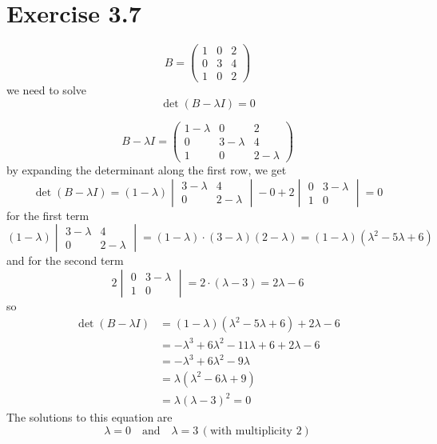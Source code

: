 \documentclass[12pt]{article}
\begin{document}
\section*{Exercise 3.7}
\[
B = \begin{pmatrix} 1 & 0 & 2 \\ 0 & 3 & 4 \\ 1 & 0 & 2 \end{pmatrix}
\]
we need to solve
\[
\det(B - \lambda I) = 0
\]

\[
B - \lambda I = \begin{pmatrix} 1 - \lambda & 0 & 2 \\ 0 & 3 - \lambda & 4 \\ 1 & 0 & 2 - \lambda \end{pmatrix}
\]
by expanding the determinant along the first row, we get
\[
\det(B - \lambda I) = (1 - \lambda) \begin{vmatrix} 3 - \lambda & 4 \\ 0 & 2 - \lambda \end{vmatrix} - 0 + 2 \begin{vmatrix} 0 & 3 - \lambda \\ 1 & 0 \end{vmatrix} = 0
\]
for the first term
\begin{equation*}
(1 - \lambda) \begin{vmatrix} 3 - \lambda & 4 \\ 0 & 2 - \lambda \end{vmatrix} = (1 - \lambda) \cdot (3 - \lambda)(2 - \lambda) = (1 - \lambda)(\lambda^2 - 5\lambda + 6)
\end{equation*}
and for the second term
\begin{equation*}
2 \begin{vmatrix} 0 & 3 - \lambda \\ 1 & 0 \end{vmatrix} = 2 \cdot (\lambda - 3) = 2\lambda - 6    
\end{equation*}
so
\begin{align*}
\det(B - \lambda I) &= (1 - \lambda)(\lambda^2 - 5\lambda + 6) + 2\lambda - 6 \\
&= -\lambda^3 + 6\lambda^2 - 11\lambda + 6 + 2\lambda - 6 \\
&= -\lambda^3 + 6\lambda^2 - 9\lambda \\
&= \lambda(\lambda^2 - 6\lambda + 9) \\
&= \lambda(\lambda - 3)^2 = 0
\end{align*}
The solutions to this equation are
\[
\lambda = 0 \quad \text{and} \quad \lambda = 3 \, (\text{with multiplicity 2})
\]
\end{document}
